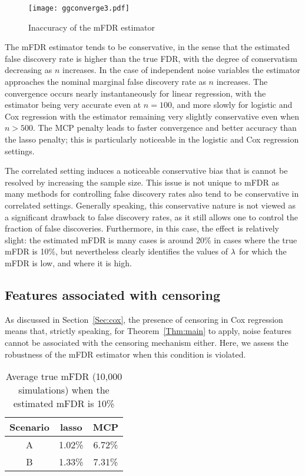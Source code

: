 \begin{figure} [!htb]
 \centering
  \texttt{[image: ggconverge3.pdf]}
  \caption{Inaccuracy of the mFDR estimator}
\end{figure}

The mFDR estimator tends to be conservative, in the sense that the estimated false discovery rate is higher than the true FDR, with the degree of conservatism decreasing as $n$ increases. In the case of independent noise variables the estimator approaches the nominal marginal false discovery rate as $n$ increases. The convergence occurs nearly instantaneously for linear regression, with the estimator being very accurate even at $n=100$, and more slowly for logistic and Cox regression with the estimator remaining very slightly conservative even when $n > 500$. The MCP penalty leads to faster convergence and better accuracy than the lasso penalty; this is particularly noticeable in the logistic and Cox regression settings.

The correlated setting induces a noticeable conservative bias that is cannot be resolved by increasing the sample size. This issue is not unique to mFDR as many methods for controlling false discovery rates also tend to be conservative in correlated settings.  Generally speaking, this conservative nature is not viewed as a significant drawback to false discovery rates, as it still allows one to control the fraction of false discoveries.  Furthermore, in this case, the effect is relatively slight: the estimated mFDR is many cases is around 20\% in cases where the true mFDR is 10\%, but nevertheless clearly identifies the values of $\lambda$ for which the mFDR is low, and where it is high.

\subsection{Features associated with censoring}

As discussed in Section~\ref{Sec:cox}, the presence of censoring in Cox regression means that, strictly speaking, for Theorem~\ref{Thm:main} to apply, noise features cannot be associated with the censoring mechanism either.  Here, we assess the robustness of the mFDR estimator when this condition is violated.

\begin{table}[b!]
 \caption{Average true mFDR (10,000 simulations) when the estimated mFDR is 10\%}
\centering
\begin{tabular}{c | c c}
  \hline
 Scenario & lasso & MCP   \\  [0.5ex]
  \hline 
   A & 1.02\% & 6.72\% \\ 
   B &  1.33\% & 7.31\% \\ 
   \hline
\end{tabular}
\end{table}

